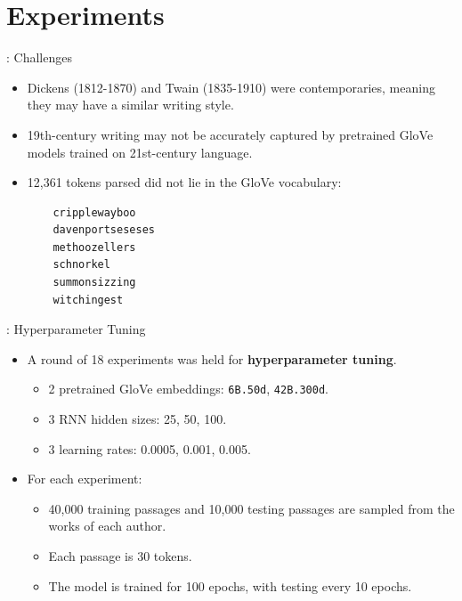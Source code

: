 \documentclass{beamer}
\begin{document}
\section{Experiments}

\begin{frame}[fragile]{\secname: Challenges}
\begin{itemize} 

\item
Dickens (1812-1870) and Twain (1835-1910) were contemporaries, meaning they may have a similar writing style.

\item
19th-century writing may not be accurately captured by pretrained GloVe models trained on 21st-century language.

\item
12,361 tokens parsed did not lie in the GloVe vocabulary:

\begin{verbatim}
    cripplewayboo 
    davenportseseses
    methoozellers 
    schnorkel
    summonsizzing
    witchingest
\end{verbatim}

\end{itemize}
\end{frame}

\begin{frame}{\secname: Hyperparameter Tuning}
\begin{itemize}
\item A round of 18 experiments was held for \textbf{hyperparameter tuning}.
\begin{itemize}
\item 
2 pretrained GloVe embeddings: \texttt{6B.50d}, \texttt{42B.300d}.

\item
3 RNN hidden sizes: 25, 50, 100.

\item
3 learning rates: 0.0005, 0.001, 0.005.

\end{itemize}

\item
For each experiment:
\begin{itemize}
    \item 40,000 training passages and 10,000 testing passages are sampled from the works of each author.
    \item Each passage is 30 tokens.
    \item The model is trained for 100 epochs, with testing every 10 epochs.
\end{itemize}

\end{itemize}
\end{frame}
\end{document}
